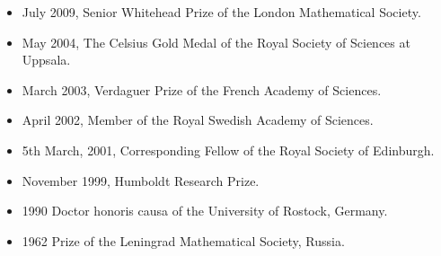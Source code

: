\documentclass{article}
\begin{document}
\begin{itemize}
    
  \item July 2009, 
                        {Senior Whitehead Prize of the London Mathematical Society}.
\item May 2004, The Celsius Gold Medal of the Royal Society of Sciences at Uppsala.

 \item  March 2003, Verdaguer Prize  of the
French Academy of Sciences.
\item April 2002, Member of the Royal
Swedish Academy of Sciences.
       \item 5th March, 2001, Corresponding
Fellow of the Royal Society of 
  Edinburgh.
       \item November 1999, Humboldt Research
Prize.
        \item 1990 Doctor honoris causa of the
University of Rostock, Germany.
       \item 1962 Prize of the Leningrad
Mathematical Society, Russia.
\end{itemize}

\medskip
\end{document}
